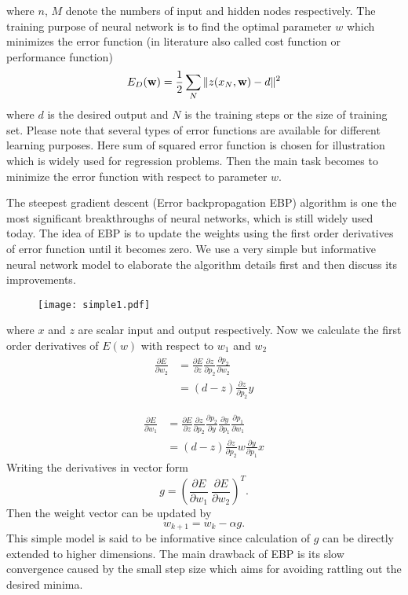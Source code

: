 \documentclass[paper=a4, fontsize=12pt]{scrartcl}	%
\numberwithin{equation}{section}					%
\numberwithin{figure}{section}					%
\numberwithin{table}{section}					%
\begin{document}
where $n$, $M$ denote the numbers of input and hidden nodes respectively. The training purpose of neural network is to find the optimal parameter $w$ which minimizes the error function (in literature also called cost function or performance function)
\begin{equation}
E_D({\bf w})=\frac{1}{2}\sum_N\| z(x_N, {\bf w}) - d\|^2 \label{error}
\end{equation}
where $d$ is the desired output and $N$ is the training steps or the size of training set. Please note that several types of error functions are available for different learning purposes. Here sum of squared error function is chosen for illustration which is widely used for regression problems. Then the main task becomes to minimize the error function with respect to parameter $w$. 

The steepest gradient descent (Error backpropagation EBP) algorithm is one the most significant breakthroughs of neural networks, which is still widely used today. The idea of EBP is to update the weights using the first order derivatives of error function until it becomes zero. We use a very simple but informative neural network model to elaborate the algorithm details first and then discuss its improvements. 

\begin{figure}[\h]
\centering
\texttt{[image: simple1.pdf]}
\end{figure}
where $x$ and $z$ are scalar input and output respectively.  Now we calculate the first order derivatives of $E(w)$ with respect to $w_1$ and $w_2$
\begin{align}
\nonumber \frac{\partial E}{\partial w_2} &=\frac{\partial E}{\partial z}\frac{\partial z}{\partial p_2}\frac{\partial p_2}{\partial w_2}\\
\nonumber &=(d-z)\frac{\partial z}{\partial p_2} y
\end{align}

\begin{align}
\nonumber \frac{\partial E}{\partial w_1} &=\frac{\partial E}{\partial z}\frac{\partial z}{\partial p_2}\frac{\partial p_2}{\partial y} \frac{\partial y}{\partial p_1}\frac{\partial p_1}{\partial w_1}\\
\nonumber &=(d-z)\frac{\partial z}{\partial p_2}w\frac{\partial y}{\partial p_1} x
\end{align}
Writing the derivatives in vector form 
\begin{equation}
g = (\frac{\partial E}{\partial w_1}\  \frac{\partial E}{\partial w_2})^T. 
\end{equation}
Then the weight vector can be updated by 
\begin{equation}
w_{k+1} = w_k-\alpha g. 
\end{equation}
This simple model is said to be informative since calculation of $g$ can be directly extended to higher dimensions. The main drawback of EBP is its slow convergence caused by the small step size which aims for avoiding rattling out the desired minima. 
\end{document}
